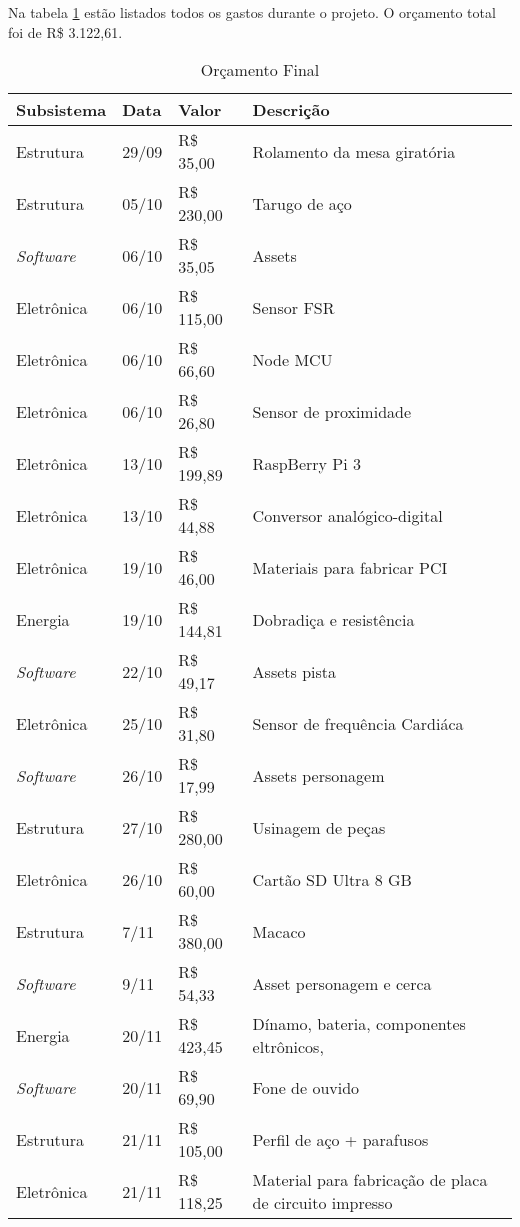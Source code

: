 Na tabela \ref{orcamento} estão listados todos os gastos durante o projeto. O orçamento total foi de R\$ 3.122,61.

\begin{table}[htp]
\centering
\caption{Orçamento Final}
\label{orcamento}
\begin{tabular}{|l|l|l|l|}
\hline
\textbf{Subsistema} & \textbf{Data} & \textbf{Valor} & \textbf{Descrição} \\ \hline
Estrutura & 29/09 & R\$ 35,00 & Rolamento da mesa giratória \\ \hline
Estrutura & 05/10 & R\$ 230,00 & Tarugo de aço \\ \hline
\textit{Software} & 06/10 & R\$ 35,05 & Assets \\ \hline
Eletrônica & 06/10 & R\$ 115,00 & Sensor FSR \\ \hline
Eletrônica & 06/10 & R\$ 66,60 & Node MCU \\ \hline
Eletrônica & 06/10 & R\$ 26,80 & Sensor de proximidade \\ \hline
Eletrônica & 13/10 & R\$ 199,89 & RaspBerry Pi 3 \\ \hline
Eletrônica & 13/10 & R\$ 44,88 & Conversor analógico-digital \\ \hline
Eletrônica & 19/10 & R\$ 46,00 & Materiais para fabricar PCI \\ \hline
Energia & 19/10 & R\$ 144,81 & Dobradiça e resistência \\ \hline
\textit{Software} & 22/10 & R\$ 49,17 & Assets pista \\ \hline
Eletrônica & 25/10 & R\$ 31,80 & Sensor de frequência Cardiáca \\ \hline
\textit{Software} & 26/10 & R\$ 17,99 & Assets personagem \\ \hline
Estrutura & 27/10 & R\$ 280,00 & Usinagem de peças \\ \hline
Eletrônica & 26/10 & R\$ 60,00 & Cartão SD Ultra 8 GB \\ \hline
Estrutura & 7/11 & R\$ 380,00 & Macaco \\ \hline
\textit{Software} & 9/11 & R\$ 54,33 & Asset personagem e cerca \\ \hline
Energia & 20/11 & R\$ 423,45 & Dínamo, bateria, componentes eltrônicos, \\ \hline
\textit{Software} & 20/11 & R\$ 69,90 & Fone de ouvido \\ \hline
Estrutura & 21/11 & R\$ 105,00 & Perfil de aço + parafusos \\ \hline
Eletrônica & 21/11 & R\$ 118,25 & Material para fabricação de placa de circuito impresso \\ \hline

\end{tabular}
\end{table}
